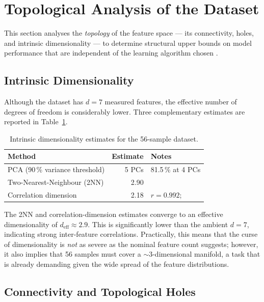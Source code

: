 \documentclass[12pt,a4paper]{article}
\begin{document}
\section{Topological Analysis of the Dataset}
\label{sec:topology}

This section analyses the \emph{topology} of the feature space — its
connectivity, holes, and intrinsic dimensionality — to determine structural
upper bounds on model performance that are independent of the learning
algorithm chosen \citep{Carlsson2009, Edelsbrunner2010}.

\subsection{Intrinsic Dimensionality}

Although the dataset has $d=7$ measured features, the effective number of
degrees of freedom is considerably lower.  Three complementary estimates
are reported in Table~\ref{tab:intdim}.

\begin{table}[h]
\centering
\caption{Intrinsic dimensionality estimates for the 56-sample dataset.}
\label{tab:intdim}
\begin{tabular}{lrl}
\toprule
Method & Estimate & Notes \\
\midrule
PCA (90\,\% variance threshold) & 5 PCs & 81.5\,\% at 4 PCs \citep{Jolliffe2002} \\
Two-Nearest-Neighbour (2NN) & 2.90 & \citet{Facco2017} \\
Correlation dimension          & 2.18 & $r=0.992$; \citet{Grassberger1983} \\
\bottomrule
\end{tabular}
\end{table}

The 2NN and correlation-dimension estimates converge to an effective
dimensionality of $d_{\text{eff}} \approx 2.9$.  This is significantly
lower than the ambient $d=7$, indicating strong inter-feature correlations.
Practically, this means that the curse of dimensionality \citep{Bellman1957, Hastie2009} is \emph{not} as
severe as the nominal feature count suggests; however, it also implies that
56 samples must cover a $\sim$3-dimensional manifold, a task that is
already demanding given the wide spread of the feature distributions.

\subsection{Connectivity and Topological Holes}
\end{document}
